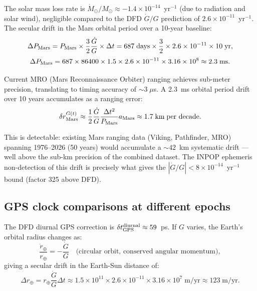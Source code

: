\documentclass[aps,prd,twocolumn,superscriptaddress,nofootinbib,longbibliography]{revtex4-2}
\newcommand{\ee}[1]{\times 10^{#1}}
\begin{document}
The solar mass loss rate is $\dot{M}_\odot/M_\odot \approx -1.4\ee{-14}$~yr$^{-1}$
(due to radiation and solar wind), negligible compared to the DFD $\dot{G}/G$
prediction of $2.6\ee{-11}$~yr$^{-1}$.  The secular drift in the Mars orbital
period over a 10-year baseline:
\begin{equation}
\Delta P_{\rm Mars} = P_{\rm Mars}\times\frac{3}{2}\frac{\dot{G}}{G}\times\Delta t
= 687\;\text{days}\times\frac{3}{2}\times 2.6\ee{-11}\times 10\;\text{yr},
\label{eq:Mars-Pdot}
\end{equation}
\begin{equation}
\Delta P_{\rm Mars} = 687\times 86400\times 1.5\times 2.6\ee{-11}\times 3.16\ee{8}
\approx 2.3\;\text{ms}.
\label{eq:Mars-Pdot-num}
\end{equation}

Current MRO (Mars Reconnaissance Orbiter) ranging achieves sub-meter
precision, translating to timing accuracy of $\sim\!3\;\mu$s. A 2.3~ms
orbital period drift over 10 years accumulates as a ranging error:
\begin{equation}
\delta r_{\rm Mars}^{G(t)} \approx \frac{1}{2}\frac{\dot{G}}{G}
\frac{\Delta t^2}{P_{\rm Mars}}a_{\rm Mars}
\approx 1.7\;\text{km}\;\text{per decade}.
\label{eq:Mars-range-drift}
\end{equation}

This is detectable: existing Mars ranging data (Viking, Pathfinder, MRO)
spanning 1976--2026 (50 years) would accumulate a $\sim\!42$~km systematic
drift --- well above the sub-km precision of the combined dataset.  The INPOP
ephemeris non-detection of this drift is precisely what gives the
$|\dot{G}/G| < 8\ee{-14}$~yr$^{-1}$ bound (factor 325 above DFD).

\subsection{GPS clock comparisons at different epochs}

The DFD diurnal GPS correction is $\delta t_{\rm GPS}^{\rm diurnal} \approx 59$~ps.
If $G$ varies, the Earth's orbital radius changes as:
\begin{equation}
\frac{\dot{r}_\oplus}{r_\oplus} = -\frac{\dot{G}}{G}
\quad\text{(circular orbit, conserved angular momentum)},
\label{eq:Earth-rdot}
\end{equation}
giving a secular drift in the Earth-Sun distance of:
\begin{equation}
\Delta r_\oplus = r_\oplus\frac{\dot{G}}{G}\Delta t
\approx 1.5\ee{11}\times 2.6\ee{-11}\times 3.16\ee{7}\;\text{m/yr}
\approx 123\;\text{m/yr}.
\label{eq:Earth-drift}
\end{equation}
\end{document}
